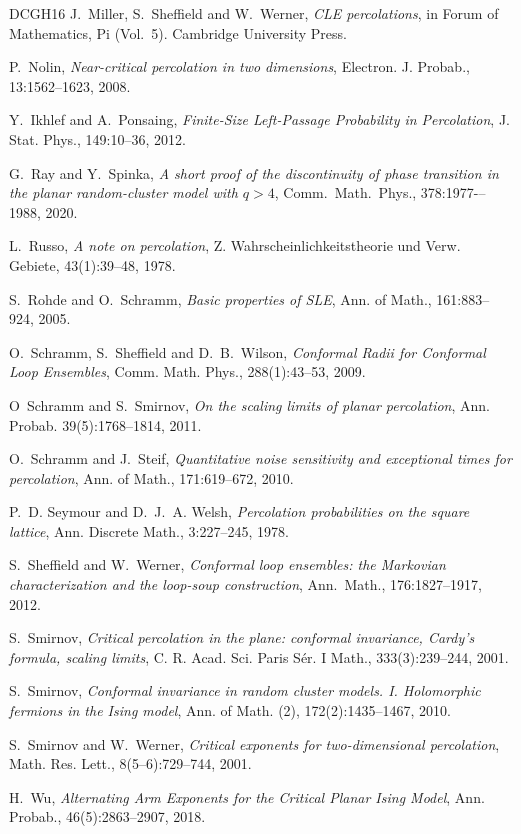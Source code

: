 \documentclass[a4paper,oneside,11pt]{article}
\numberwithin{equation}{section}
\numberwithin{equation}{section}
\numberwithin{equation}{section}
\begin{document}
\begin{thebibliography}{DCGH{\etalchar{+}}16}
J.~Miller, S.~Sheffield and W.~Werner, 
{\em CLE percolations}, 
in Forum of Mathematics, Pi (Vol.~5). Cambridge University Press.

P.~Nolin, 
\emph{Near-critical percolation in two dimensions}, 
Electron. J. Probab., 13:1562--1623, 2008.

Y.~Ikhlef and A.~Ponsaing, 
{\em Finite-Size Left-Passage Probability in Percolation}, 
J. Stat. Phys., 149:10--36, 2012.

G.~Ray and Y.~Spinka, 
{\em A short proof of the discontinuity of phase transition in the planar random-cluster model with $q>4$}, 
Comm.~Math.~Phys., 378:1977-–1988, 2020.

L.~Russo, 
\emph{A note on percolation}, 
Z. Wahrscheinlichkeitstheorie und Verw. Gebiete, 43(1):39--48, 1978. 

S.~Rohde and O.~Schramm, 
{\em Basic properties of SLE}, 
Ann. of Math., 161:883--924, 2005. 

O.~Schramm, S.~Sheffield and D.~B.~Wilson,
{\em Conformal Radii for Conformal Loop Ensembles}, 
Comm. Math. Phys., 288(1):43--53, 2009.

O~Schramm and S.~Smirnov, 
\emph{On the scaling limits of planar percolation}, 
Ann. Probab. 39(5):1768--1814, 2011.

O.~Schramm and J.~Steif,
{\em Quantitative noise sensitivity and exceptional times for percolation},
Ann. of Math., 171:619--672, 2010.

P.~D. Seymour and D.~J.~A. Welsh, 
{\em Percolation probabilities on the square lattice},
Ann. Discrete Math., 3:227--245, 1978.

S.~Sheffield and W.~Werner, 
{\em Conformal loop ensembles: the Markovian characterization and the loop-soup construction}, 
Ann.~Math., 176:1827--1917, 2012.

S.~Smirnov, 
\emph{Critical percolation in the plane: conformal invariance, {C}ardy's formula, scaling limits}, 
C. R. Acad. Sci. Paris S{\'e}r. I Math., 333(3):239--244, 2001.  

S.~Smirnov, 
\emph{Conformal invariance in random cluster models. {I}. {H}olomorphic fermions in the {I}sing model}, 
Ann. of Math. (2), 172(2):1435--1467, 2010.

S.~Smirnov and W.~Werner, 
\emph{Critical exponents for two-dimensional percolation}, 
Math. Res. Lett., 8(5--6):729--744, 2001. 

H.~Wu, 
{\em Alternating Arm Exponents for the Critical Planar Ising Model},
Ann. Probab., 46(5):2863--2907, 2018. 

\end{thebibliography}
\end{document}

